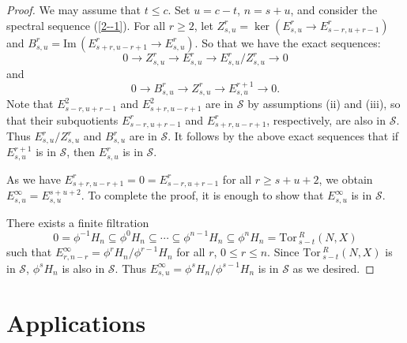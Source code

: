 \documentclass[10pt]{amsart}
\newcommand{\Tor}{\mbox{Tor}\,}
\newcommand{\im}{\mbox{Im}\,}
\begin{document}
\begin{proof} We may assume that $t\leq c$. Set $u= c- t$, $n= s+u$, and consider the spectral
sequence (\ref {2--1}). For all $r\geq 2$, let $Z_{s,
u}^{r}= \ker(E_{s, u}^{r} \longrightarrow E_{s- r, u+ r -1}^{r})$
and $B_{s, u}^{r}= \im(E_{s+ r, u- r+1}^{r}\longrightarrow E_{s,
u}^{r})$. So that we have the exact sequences:
$$0\longrightarrow Z_{s, u}^{r}\longrightarrow E_{s, u}^{r}\longrightarrow E_{s, u}^{r}/Z_{s, u}^{r}
\longrightarrow 0$$ and
$$0\longrightarrow B_{s, u}^{r}\longrightarrow Z_{s, u}^{r}\longrightarrow E_{s, u}^{r+ 1}\longrightarrow 0.$$
Note that $E_{s- r, u+ r -1}^{2}$ and $E_{s+ r, u- r+1}^{2}$ are in
$\mathcal{S}$ by assumptions (ii) and (iii), so that their
subquotients $E_{s- r, u+ r -1}^{r}$ and $E_{s+ r, u- r+1}^{r}$,
respectively, are also in $\mathcal{S}$. Thus $E_{s, u}^{r}/Z_{s,
u}^{r}$ and $B_{s, u}^{r}$ are in $\mathcal{S}$. It follows by the
above exact sequences that if $E_{s, u}^{r+ 1}$ is in $\mathcal{S}$,
then $E_{s, u}^{r}$ is in $\mathcal{S}$.

As we have $E_{s+ r, u- r+1}^{r}= 0= E_{s- r, u+ r- 1}^{r}$ for all
$r \geq s+ u+ 2$, we obtain $E_{s, u}^{\infty}= E_{s, u}^{s +u+ 2}$.
To complete the proof, it is enough to show that $E_{s, u}^{\infty}$
is in $ \mathcal{S}$.

There exists a finite filtration
$$0= \phi^{-1}H_{n}\subseteq \phi^{0}H_{n}\subseteq \cdots\subseteq \phi^{n- 1}H_{n}\subseteq
\phi^{n}H_{n}= \Tor^{R}_{s- t}(N, X)$$ such that $E_{r,
n-r}^{\infty}= \phi^{r}H_{n}/\phi^{r-1}H_{n}$ for all $r$, $0\leq
r\leq n$. Since $\Tor^{R}_{s- t}(N, X)$ is in $\mathcal{S}$,
$\phi^{s}H_{n}$ is also in $\mathcal{S}$. Thus $E_{s, u}^{\infty}=
\phi^{s}H_{n}/\phi^{s- 1}H_{n}$ is in $ \mathcal{S}$ as we desired.
\end{proof}


\section{Applications}


\end{document}
